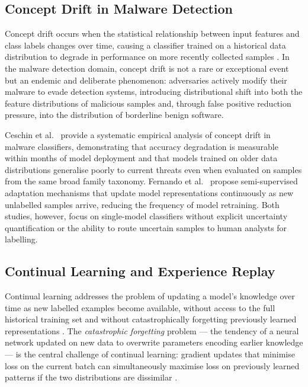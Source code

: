\subsection{Concept Drift in Malware Detection}
\label{sec:lit_drift}

Concept drift occurs when the statistical relationship between input features and class labels
changes over time, causing a classifier trained on a historical data distribution to degrade
in performance on more recently collected
samples \cite{Ceschin2022ConceptDrift, Fernando2024FeSAD}.
In the malware detection domain, concept drift is not a rare or exceptional event but an
endemic and deliberate phenomenon: adversaries actively modify their malware to evade detection
systems, introducing distributional shift into both the feature distributions of malicious
samples and, through false positive reduction pressure, into the distribution of borderline
benign software.

Ceschin et al.\ \cite{Ceschin2022ConceptDrift} provide a systematic empirical analysis of
concept drift in malware classifiers, demonstrating that accuracy degradation is measurable
within months of model deployment and that models trained on older data distributions
generalise poorly to current threats even when evaluated on samples from the same broad family
taxonomy.
Fernando et al.\ \cite{Fernando2024FeSAD} propose semi-supervised adaptation mechanisms that
update model representations continuously as new unlabelled samples arrive, reducing the
frequency of model retraining.
Both studies, however, focus on single-model classifiers without explicit uncertainty
quantification or the ability to route uncertain samples to human analysts for labelling.

\subsection{Continual Learning and Experience Replay}
\label{sec:lit_cl}

Continual learning addresses the problem of updating a model's knowledge over time as new
labelled examples become available, without access to the full historical training set and
without catastrophically forgetting previously learned
representations \cite{rolnick2019experience}.
The \emph{catastrophic forgetting} problem — the tendency of a neural network updated on new
data to overwrite parameters encoding earlier knowledge — is the central challenge of
continual learning: gradient updates that minimise loss on the current batch can simultaneously
maximise loss on previously learned patterns if the two distributions are
dissimilar \cite{rolnick2019experience}.

